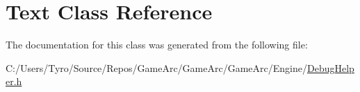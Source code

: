 \hypertarget{class_text}{}\section{Text Class Reference}
\label{class_text}


The documentation for this class was generated from the following file\+:\begin{DoxyCompactItemize}
\item 
C\+:/\+Users/\+Tyro/\+Source/\+Repos/\+Game\+Arc/\+Game\+Arc/\+Game\+Arc/\+Engine/\mbox{\hyperlink{_debug_helper_8h}{Debug\+Helper.\+h}}\end{DoxyCompactItemize}
